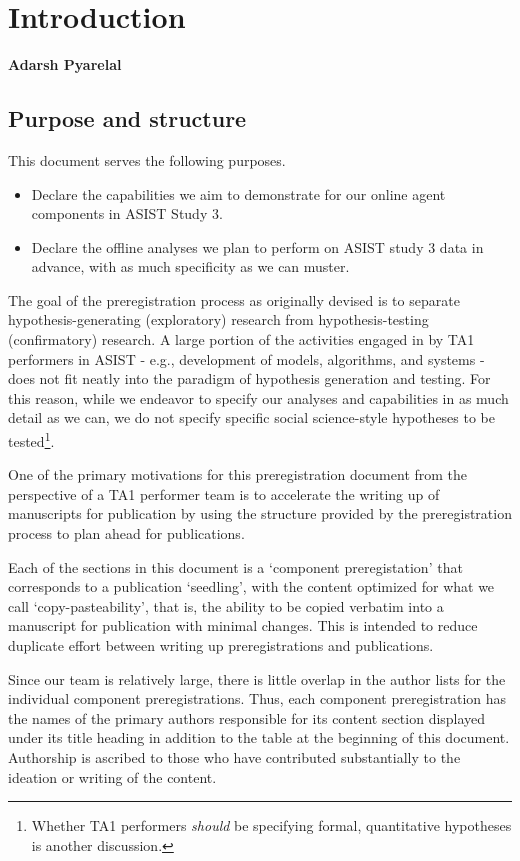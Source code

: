 \chapter{Introduction}
\textbf{Adarsh Pyarelal}

\section{Purpose and structure}

This document serves the following purposes.

\begin{itemize}
    \item Declare the capabilities we aim to demonstrate for our online agent
        components in ASIST Study 3.
    \item Declare the offline analyses we plan to perform on ASIST study 3 data
        in advance, with as much specificity as we can muster.
\end{itemize}


The goal of the preregistration process as originally devised
\citep{Nosek.ea:2018} is to separate hypothesis-generating (exploratory)
research from hypothesis-testing (confirmatory) research. A large portion of
the activities engaged in by TA1 performers in ASIST - e.g., development of
models, algorithms, and systems - does not fit neatly into the paradigm of
hypothesis generation and testing.  For this reason, while we endeavor to
specify our analyses and capabilities in as much detail as we can, we do not
specify specific social science-style hypotheses to be tested\footnote{Whether
TA1 performers \emph{should} be specifying formal, quantitative hypotheses is
another discussion.}.

One of the primary motivations for this preregistration document from the
perspective of a TA1 performer team is to accelerate the writing up of
manuscripts for publication by using the structure provided by the
preregistration process to plan ahead for publications.

Each of the sections in this document is a `component preregistation' that
corresponds to a publication `seedling', with the content optimized for what we
call `copy-pasteability', that is, the ability to be copied verbatim into a
manuscript for publication with minimal changes. This is intended to reduce
duplicate effort between writing up preregistrations and publications.

Since our team is relatively large, there is little overlap in the author lists
for the individual component preregistrations. Thus, each component
preregistration has the names of the primary authors responsible for its
content section displayed under its title heading in addition to the table at
the beginning of this document. Authorship is ascribed to those who have
contributed substantially to the ideation or writing of the content.

